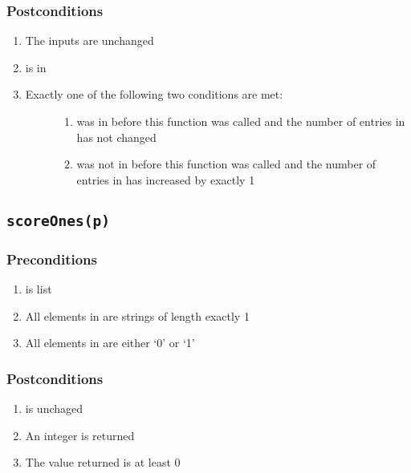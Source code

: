 \documentclass[letterpaper,10pt,english]{sphinxmanual}
\begin{document}
\subsubsection{Postconditions}
\label{contracts:id24}\begin{enumerate}
\item {} 
The inputs are unchanged

\item {} 
 is in 

\item {} \begin{description}
\item[{Exactly one of the following two conditions are met:}] \leavevmode\begin{enumerate}
\item {} 
 was in  before this function was called and the number of entries in  has not changed

\item {} 
 was not in  before this function was called and the number of entries in  has increased by exactly 1

\end{enumerate}

\end{description}

\end{enumerate}


\subsection{\texttt{scoreOnes(p)}}
\label{contracts:scoreones-p}

\subsubsection{Preconditions}
\label{contracts:id25}\begin{enumerate}
\item {} 
 is list

\item {} 
All elements in  are strings of length exactly 1

\item {} 
All elements in  are either `0' or `1'

\end{enumerate}


\subsubsection{Postconditions}
\label{contracts:id26}\begin{enumerate}
\item {} 
 is unchaged

\item {} 
An integer is returned

\item {} 
The value returned is at least 0

\end{enumerate}
\end{document}
